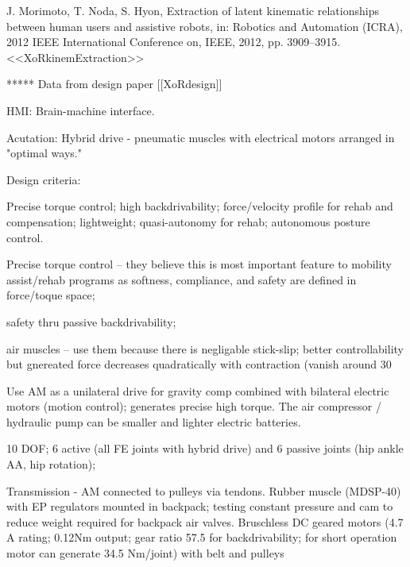 J. Morimoto, T. Noda, S. Hyon, Extraction of latent kinematic relationships between human users and assistive robots, in: Robotics and Automation (ICRA), 2012 IEEE International Conference on, IEEE, 2012, pp. 3909–3915. <<XoRkinemExtraction>>


***** Data from design paper [[XoRdesign]]

HMI: 
Brain-machine interface.

Acutation:  
Hybrid drive - pneumatic muscles with electrical motors arranged in "optimal ways."

Design criteria:

Precise torque control; high backdrivability; force/velocity profile for rehab and compensation; lightweight; quasi-autonomy for rehab; autonomous posture control.

Precise torque control -- they believe this is most important feature to mobility assist/rehab programs as softness, compliance, and safety are defined in force/toque space;

safety thru passive backdrivability;

air muscles -- use them because there is negligable stick-slip; better controllability but gnereated force decreases quadratically with contraction (vanish around 30%

Use AM as a unilateral drive for gravity comp combined with bilateral electric motors (motion control); generates precise high torque.  The air compressor / hydraulic pump can be smaller and lighter electric batteries.

10 DOF; 6 active (all FE joints with hybrid drive) and 6 passive joints (hip ankle AA, hip rotation);

Transmission - AM connected to pulleys via tendons.  Rubber muscle (MDSP-40) with EP regulators mounted in backpack; testing constant pressure and cam to reduce weight required for backpack air valves.  Bruschless DC geared motors (4.7 A rating; 0.12Nm output; gear ratio 57.5 for backdrivability; for short operation motor can generate 34.5 Nm/joint) with belt and pulleys

